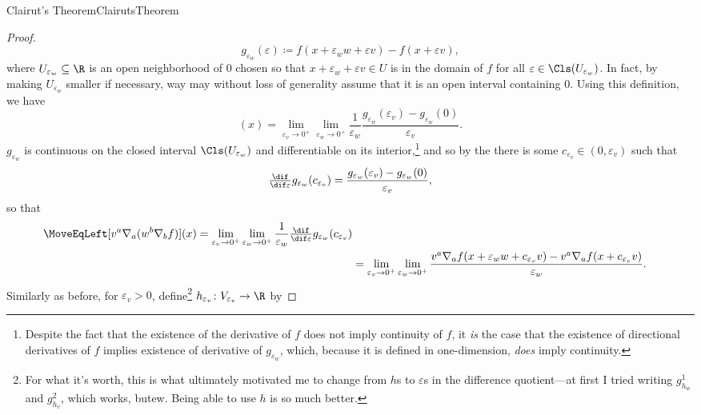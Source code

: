 \begin{thm}{Clairut's Theorem}{ClairutsTheorem}
\begin{proof}
\begin{equation}
g_{\varepsilon _w}(\varepsilon )\coloneqq f(x+\varepsilon _ww+\varepsilon v)-f(x+\varepsilon v),
\end{equation}
where $U_{\varepsilon _w}\subseteq \R $ is an open neighborhood of $0$ chosen so that $x+\varepsilon _w+\varepsilon v\in U$ is in the domain of $f$ for all $\varepsilon \in \Cls (U_{\varepsilon _w})$.  In fact, by making $U_{\varepsilon _w}$ smaller if necessary, way may without loss of generality assume that it is an open interval containing $0$.  Using this definition, we have
\begin{equation*}
[v^a\nabla _a(w^b\nabla _bf)](x)=\lim _{\varepsilon _v\to 0^+}\lim _{\varepsilon _w\to 0^+}\frac{1}{\varepsilon _w}\frac{g_{\varepsilon _w}(\varepsilon _v)-g_{\varepsilon _w}(0)}{\varepsilon _v}.
\end{equation*}
$g_{\varepsilon _w}$ is continuous on the closed interval $\Cls (U_{\varepsilon _w})$ and differentiable on its interior,\footnote{Despite the fact that the existence of the derivative of $f$ does not imply continuity of $f$, it \emph{is} the case that the existence of directional derivatives of $f$ implies existence of derivative of $g_{\varepsilon _w}$, which, because it is defined in one-dimension, \emph{does} imply continuity.} and so by the  there is some $c_{\varepsilon _v}\in (0,\varepsilon _v)$ such that
\begin{equation}
\tfrac{\dif}{\dif \varepsilon}g_{\varepsilon _w}(c_{\varepsilon _v})=\frac{g_{\varepsilon _w}(\varepsilon _v)-g_{\varepsilon _w}(0)}{\varepsilon _v},
\end{equation}
so that
{\scriptsize
\begin{equation*}
\begin{split}
\MoveEqLeft
[v^a\nabla _a(w^b\nabla _bf)](x)=\lim _{\varepsilon _v\to 0^+}\lim _{\varepsilon _w\to 0^+}\frac{1}{\varepsilon _w}\tfrac{\dif}{\dif \varepsilon}g_{\varepsilon _w}(c_{\varepsilon _v}) \\
& =\lim _{\varepsilon _v\to 0^+}\lim _{\varepsilon _w\to 0^+}\frac{v^a\nabla _af(x+\varepsilon _ww+c_{\varepsilon _v}v)-v^a\nabla _af(x+c_{\varepsilon _v}v)}{\varepsilon _w}.
\end{split}
\end{equation*}
}
Similarly as before, for $\varepsilon _v>0$, define\footnote{For what it's worth, this is what ultimately motivated me to change from $h$s to $\varepsilon$s in the difference quotient---at first I tried writing $g_{h_w}^1$ and $g_{h_v}^2$, which works, but\textellipsis ew.  Being able to use $h$ is so much better.} $h_{\varepsilon _v}\colon V_{\varepsilon _v}\rightarrow \R$ by

\end{proof}
\end{thm}
